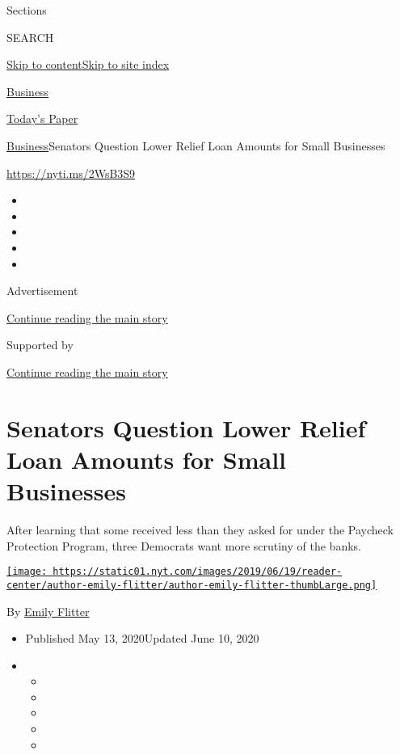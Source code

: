 Sections

SEARCH

\protect\hyperlink{site-content}{Skip to
content}\protect\hyperlink{site-index}{Skip to site index}

\href{https://www.nytimes.com/section/business}{Business}

\href{https://myaccount.nytimes.com/auth/login?response_type=cookie\&client_id=vi}{}

\href{https://www.nytimes.com/section/todayspaper}{Today's Paper}

\href{/section/business}{Business}\textbar{}Senators Question Lower
Relief Loan Amounts for Small Businesses

\url{https://nyti.ms/2WsB3S9}

\begin{itemize}
\item
\item
\item
\item
\item
\end{itemize}

Advertisement

\protect\hyperlink{after-top}{Continue reading the main story}

Supported by

\protect\hyperlink{after-sponsor}{Continue reading the main story}

\hypertarget{senators-question-lower-relief-loan-amounts-for-small-businesses}{%
\section{Senators Question Lower Relief Loan Amounts for Small
Businesses}\label{senators-question-lower-relief-loan-amounts-for-small-businesses}}

After learning that some received less than they asked for under the
Paycheck Protection Program, three Democrats want more scrutiny of the
banks.

\href{https://www.nytimes.com/by/emily-flitter}{\texttt{[image: https://static01.nyt.com/images/2019/06/19/reader-center/author-emily-flitter/author-emily-flitter-thumbLarge.png]}}

By \href{https://www.nytimes.com/by/emily-flitter}{Emily Flitter}

\begin{itemize}
\item
  Published May 13, 2020Updated June 10, 2020
\item
  \begin{itemize}
  \item
  \item
  \item
  \item
  \item
  \end{itemize}
\end{itemize}

